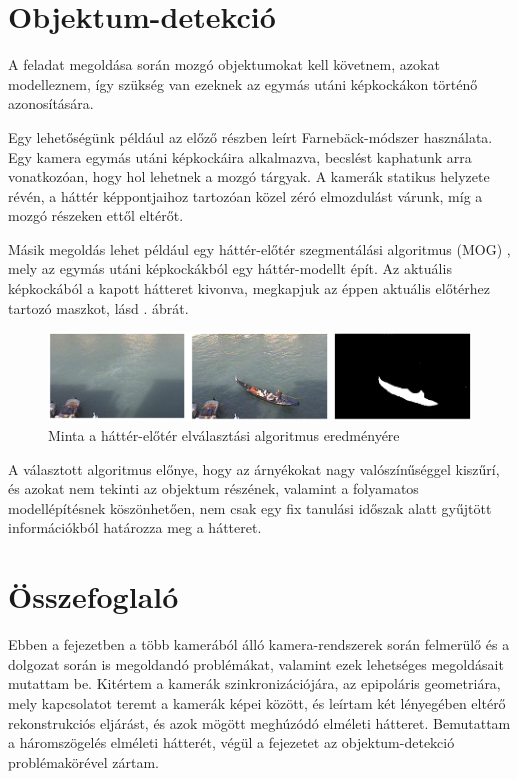 \section{Objektum-detekció \label{sec:obj_detection}}


A feladat megoldása során mozgó objektumokat kell követnem, azokat modelleznem, így szükség van ezeknek az egymás utáni képkockákon történő azonosítására.

Egy lehetőségünk például az előző részben leírt Farnebäck-módszer használata. Egy kamera egymás utáni képkockáira alkalmazva, becslést kaphatunk arra vonatkozóan, hogy hol lehetnek a mozgó tárgyak. A kamerák statikus helyzete révén, a háttér képpontjaihoz tartozóan közel zéró elmozdulást várunk, míg a mozgó részeken ettől eltérőt.

Másik megoldás lehet például egy háttér-előtér szegmentálási algoritmus (MOG) \cite{MOG}, mely az egymás utáni képkockákból egy háttér-modellt épít. Az aktuális képkockából a kapott hátteret kivonva, megkapjuk az éppen aktuális előtérhez tartozó maszkot, lásd . ábrát.

\begin{figure}[tbh]
\centering
\includegraphics{figures/mog.png}
\caption{Minta a háttér-előtér elválasztási algoritmus eredményére \cite{mog-example} \label{fig:mog-example}}
\end{figure}

A választott algoritmus előnye, hogy az árnyékokat nagy valószínűséggel kiszűrí, és azokat nem tekinti az objektum részének, valamint a folyamatos modellépítésnek köszönhetően, nem csak egy fix tanulási időszak alatt gyűjtött információkból határozza meg a hátteret.


\section{Összefoglaló}

Ebben a fejezetben a több kamerából álló kamera-rendszerek során felmerülő és a dolgozat során is megoldandó problémákat, valamint ezek lehetséges megoldásait mutattam be. Kitértem a kamerák szinkronizációjára, az epipoláris geometriára, mely kapcsolatot teremt a kamerák képei között, és leírtam két lényegében eltérő rekonstrukciós eljárást, és azok mögött meghúzódó elméleti hátteret. Bemutattam a háromszögelés elméleti hátterét, végül a fejezetet az objektum-detekció problémakörével zártam.